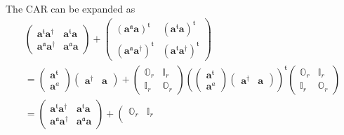 \documentclass[aps, preprint]{revtex4}
\begin{document}
The CAR can be expanded as
\begin{gather}\left (\begin{array}{cc}\mathbf{a}^{\mathfrak{t}} \mathbf{a}^{ \dag } & \mathbf{a}^{\mathfrak{t}} \mathbf{a} \\
\mathbf{a}^{\mathfrak{a}} \mathbf{a}^{ \dag } & \mathbf{a}^{\mathfrak{a}} \mathbf{a}\end{array}\right ) +\left (\begin{array}{cc}\left (\mathbf{a}^{\mathfrak{a}} \mathbf{a}\right )^{\mathfrak{t}} & \left (\mathbf{a}^{\mathfrak{t}} \mathbf{a}\right )^{\mathfrak{t}} \\
\left (\mathbf{a}^{\mathfrak{a}} \mathbf{a}^{ \dag }\right )^{\mathfrak{t}} & \left (\mathbf{a}^{\mathfrak{t}} \mathbf{a}^{ \dag }\right )^{\mathfrak{t}}\end{array}\right ) \nonumber  \\
 =\left (\begin{array}{c}\mathbf{a}^{\mathfrak{t}} \\
\mathbf{a}^{a}\end{array}\right ) \left (\begin{array}{cc}\mathbf{a}^{ \dag } & \mathbf{a}\end{array}\right ) +\left (\begin{array}{cc}\mathbb{O}_{r} & \mathbb{I}_{r} \\
\mathbb{I}_{r} & \mathbb{O}_{r}\end{array}\right ) \left (\left (\begin{array}{c}\mathbf{a}^{\mathfrak{t}} \\
\mathbf{a}^{a}\end{array}\right ) \left (\begin{array}{cc}\mathbf{a}^{ \dag } & \mathbf{a}\end{array}\right )\right )^{\mathfrak{t}} \left (\begin{array}{cc}\mathbb{O}_{r} & \mathbb{I}_{r} \\
\mathbb{I}_{r} & \mathbb{O}_{r}\end{array}\right ) \nonumber  \\
 =\left (\begin{array}{cc}\mathbf{a}^{\mathfrak{t}} \mathbf{a}^{ \dag } & \mathbf{a}^{\mathfrak{t}} \mathbf{a} \\
\mathbf{a}^{\mathfrak{a}} \mathbf{a}^{ \dag } & \mathbf{a}^{\mathfrak{a}} \mathbf{a}\end{array}\right ) +\left (\begin{array}{cc}\mathbb{O}_{r} & \mathbb{I}_{r} \\

\end{array}
\end{gather}
\end{document}
